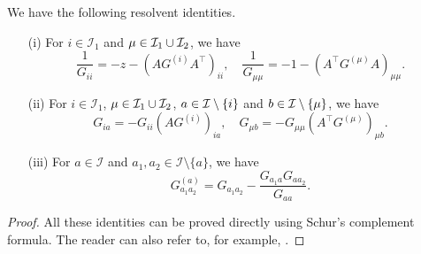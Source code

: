 \begin{lemma}\label{lemm_resolvent}
We have the following resolvent identities.
\begin{itemize}
\item[(i)]
For $i\in \mathcal I_1$ and $\mu\in \mathcal I_1\cup \cal I_2$, we have
\begin{equation}
\frac{1}{G_{ii}} =  - z - \left( {AG^{\left( i \right)} A^\top} \right)_{ii} ,\quad  \frac{1}{{G_{\mu \mu } }} =  - 1  - \left( {A^\top  G^{\left( \mu  \right)} A} \right)_{\mu \mu }.\label{resolvent2}
\end{equation}

 \item[(ii)]
 For $i\in \mathcal I_1$, $\mu \in \mathcal I_1\cup \cal I_2$, $a\in \cal I\setminus \{i\}$ and $b\in \cal I\setminus \{ \mu\}$, we have
\begin{equation}
G_{ia}   = -G_{ii}  \left( AG^{\left( {i} \right)} \right)_{ia},\quad  G_{\mu b }  = - G_{\mu \mu }  \left( A^\top  G^{\left( {\mu } \right)}  \right)_{\mu b }. \label{resolvent3}
\end{equation}

 \item[(iii)]
 For $a \in \mathcal I$ and $a_1,a_2 \in \mathcal I \setminus \{a\}$, we have
\begin{equation}
G_{a_1a_2}^{\left( a \right)}  = G_{a_1a_2}  - \frac{G_{a_1a} G_{aa_2}}{G_{aa}} .
\label{resolvent8}
\end{equation}
\end{itemize}
\end{lemma}
\begin{proof}
All these identities can be proved directly using Schur's complement formula. The reader can also refer to, for example, \cite[Lemma 4.4]{Anisotropic}.
\end{proof}


